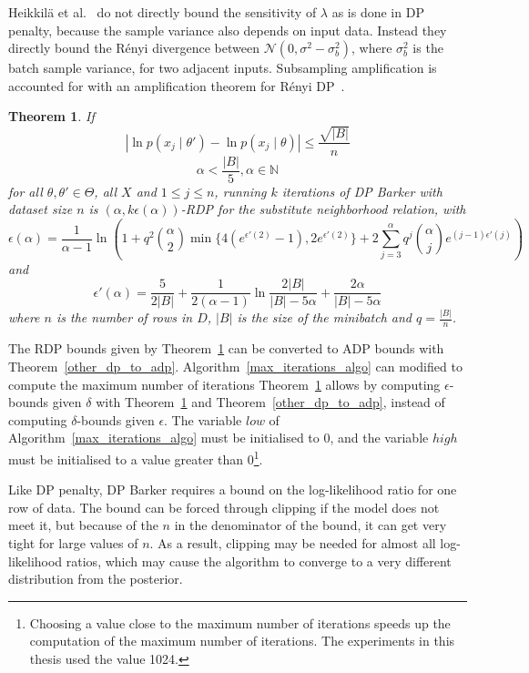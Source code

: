 \documentclass[english,twoside,openright]{HYgraduMLDS}
\newtheorem{theorem}{Theorem}
\newcommand{\N}{\mathbb{N}}
\newcommand{\caln}{{\mathcal{N}}}
\begin{document}
Heikkilä et al.~\cite{HeikkilaJDH19} do not directly bound the sensitivity
of \(\lambda\) as is done in DP penalty, because the sample variance also 
depends on input data. Instead they directly bound the Rényi divergence 
between \(\caln(0, \sigma^2 - \sigma^2_b)\), where \(\sigma^2_b\) is the 
batch sample variance, for two adjacent inputs. Subsampling amplification 
is accounted for with an amplification theorem for Rényi DP~\cite{WangBK19}.

\begin{theorem}\label{dp_barker_theorem}
    If 
    \[
        |\ln p(x_j\mid \theta') - \ln p(x_j\mid \theta)| \leq \frac{\sqrt{|B|}}{n}
    \]
    \[
        \alpha < \frac{|B|}{5}, \alpha \in \N
    \]
    for all \(\theta, \theta' \in \Theta\), all \(X\) and \(1\leq j \leq n\),
    running \(k\) iterations of DP Barker with dataset size \(n\)
    is \((\alpha, k\epsilon(\alpha))\)-RDP for the substitute neighborhood
    relation, with
    \[
        \epsilon(\alpha) = \frac{1}{\alpha - 1}\ln \left(
        1 + q^2\binom{\alpha}{2}\min\{4(e^{\epsilon'(2)} - 1), 2e^{\epsilon'(2)}\}
        + 2 \sum_{j=3}^\alpha q^j\binom{\alpha}{j}e^{(j-1)\epsilon'(j)}\right)
    \]
    and 
    \[
        \epsilon'(\alpha) = \frac{5}{2|B|} + \frac{1}{2(\alpha - 1)}
        \ln \frac{2|B|}{|B| - 5\alpha} + \frac{2\alpha}{|B| - 5\alpha}
    \]
    where \(n\) is the number of rows in \(D\), \(|B|\) is the size of the 
    minibatch and \(q = \frac{|B|}{n}\).
\end{theorem}
The RDP bounds given by Theorem~\ref{dp_barker_theorem} can be converted to
ADP bounds with Theorem~\ref{other_dp_to_adp}.
Algorithm~\ref{max_iterations_algo} can modified to compute the maximum number
of iterations Theorem~\ref{dp_barker_theorem} allows by computing
\(\epsilon\)-bounds given \(\delta\) with Theorem~\ref{dp_barker_theorem}
and Theorem~\ref{other_dp_to_adp},
instead of computing \(\delta\)-bounds given \(\epsilon\). The variable
\(low\) of Algorithm~\ref{max_iterations_algo} must be initialised to 0,
and the variable \(high\) must be initialised to a value greater than 0\footnote{
  Choosing a value close to the maximum number of iterations speeds up the
  computation of the maximum number of iterations. The experiments in this
  thesis used the value 1024.
}.

Like DP penalty, DP Barker requires a bound on the log-likelihood ratio for
one row of data. The bound can be forced through clipping if the model does not 
meet it, but because of the \(n\) in the denominator of the bound, it can get 
very tight for large values of \(n\). As a result, clipping may be needed for 
almost all log-likelihood ratios, which may cause the algorithm to converge
to a very different distribution from the posterior.
\end{document}
